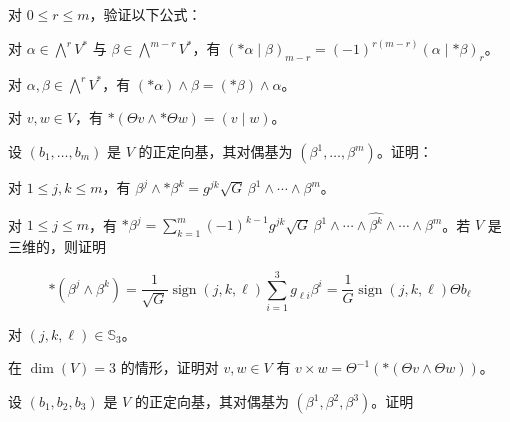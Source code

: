 \begin{exercises}
\item

对 $ 0 \le r \le m $，验证以下公式：

\begin{items}
\item

对 $ \alpha \in \bigwedge^{r}V^{*} $ 与 $ \beta \in \bigwedge^{m-r}V^{*} $，有 $ (\ast\alpha\mid\beta)_{m-r} = (-1)^{r(m-r)}(\alpha\mid\ast\beta)_{r} $。

\item

对 $ \alpha,\beta \in \bigwedge^{r}V^{*} $，有 $ (\ast\alpha)\wedge\beta = (\ast\beta)\wedge\alpha $。

\item

对 $ v,w \in V $，有 $ \ast(\Theta v\wedge\ast\Theta w) = (v\mid w) $。

\end{items}

\item

设 $ (b_{1},\ldots,b_{m}) $ 是 $ V $ 的正定向基，其对偶基为 $ (\beta^{1},\ldots,\beta^{m}) $。证明：

\begin{items}
\item

对 $ 1 \le j,k \le m $，有 $ \beta^{j}\wedge\ast\beta^{k} = g^{jk}\sqrt{G}\,\beta^{1}\wedge\cdots\wedge\beta^{m} $。

\item

对 $ 1 \le j \le m $，有 $ \ast\beta^{j} = \sum_{k=1}^{m}(-1)^{k-1}g^{jk}\sqrt{G}\,\beta^{1}\wedge\cdots\wedge\widehat{\beta^{k}}\wedge\cdots\wedge\beta^{m} $。若 $ V $ 是三维的，则证明

\[
\ast(\beta^{j}\wedge\beta^{k}) = \frac{1}{\sqrt{G}}\operatorname{sign}(j,k,\ell)\sum_{i=1}^{3}g_{\ell i}\beta^{i} = \frac{1}{G}\operatorname{sign}(j,k,\ell)\Theta b_{\ell}
\]

对 $ (j,k,\ell) \in \mathbb{S}_{3} $。

\end{items}

\item

在 $ \dim(V) = 3 $ 的情形，证明对 $ v,w \in V $ 有 $ v\times w = \Theta^{-1}(\ast(\Theta v\wedge\Theta w)) $。

\item

设 $ (b_{1},b_{2},b_{3}) $ 是 $ V $ 的正定向基，其对偶基为 $ (\beta^{1},\beta^{2},\beta^{3}) $。证明


\end{exercises}
